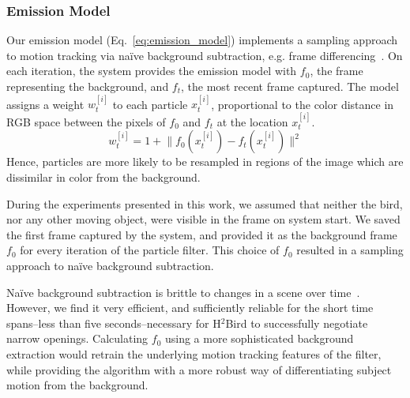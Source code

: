\documentclass{aamas2013}
\providecommand{\norm}[1]{\lVert#1\rVert}
\begin{document}
\subsubsection{Emission Model}
Our emission model (Eq.~\ref{eq:emission_model}) implements a sampling
approach to motion tracking via na\"{i}ve background subtraction, e.g. frame 
differencing~\cite{Ahad2011Computer}. On each iteration, the system provides the emission 
model with $f_0$, the frame representing the background, and $f_t$, the most 
recent frame captured. The model assigns a weight $w^{[i]}_t$ to each 
particle $x^{[i]}_t$, proportional to the color distance in RGB space 
between the pixels of $f_0$ and $f_t$ at the location $x^{[i]}_t$.
\begin{equation}
\label{eq:emission_model}
w^{[i]}_t = 1 + \norm{f_0(x^{[i]}_t)-f_t(x^{[i]}_t)}^2
\end{equation} 
Hence, particles are more likely to be resampled in regions of 
the image which are dissimilar in color from the background.

During the experiments presented in this work, we assumed that neither the 
bird, nor any other moving object, were visible in the frame on system 
start. We saved the first frame captured by the system, and provided it as 
the background frame $f_0$ for every iteration of the particle filter. This 
choice of $f_0$ resulted in a sampling approach to na\"{i}ve background 
subtraction. 

Na\"{i}ve background subtraction is brittle to changes in a scene over 
time~\cite{Ahad2011Computer}. However, we find it very efficient, and sufficiently 
reliable for the short time spans--less than five seconds--necessary for 
H$^2$Bird to successfully negotiate narrow openings. Calculating $f_0$ 
using a more sophisticated background extraction would retrain the 
underlying motion tracking features of the filter, while providing the 
algorithm with a more robust way of differentiating subject motion from the 
background.

\end{document}
